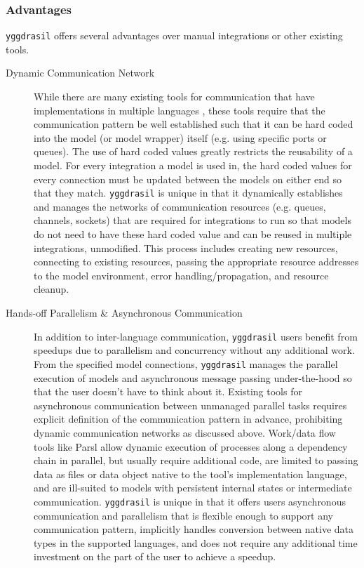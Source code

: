 \documentclass[journal]{IEEEtran}
\newcommand{\pkg}{{\tt yggdrasil}{}}
\begin{document}
\subsubsection{Advantages}\label{SS:advantages}
%
{\pkg} offers several advantages over manual integrations or other existing tools.
%
\begin{description}
	\item[Dynamic Communication Network] While there are many existing tools for communication that have implementations in multiple languages \citep[some of which {\pkg} uses, e.g.][ZMQ, RabbitMQ, OpenMPI]{ZMQ, RMQ, Gabriel2004}, these tools require that the communication pattern be well established such that it can be hard coded into the model (or model wrapper) itself (e.g. using specific ports or queues). The use of hard coded values greatly restricts the reusability of a model. For every integration a model is used in, the hard coded values for every connection must be updated between the models on either end so that they match. {\pkg} is unique in that it dynamically establishes and manages the networks of communication resources (e.g. queues, channels, sockets) that are required for integrations to run so that models do not need to have these hard coded value and can be reused in multiple integrations, unmodified. This process includes creating new resources, connecting to existing resources, passing the appropriate resource addresses to the model environment, error handling/propagation, and resource cleanup. 
	\item[Hands-off Parallelism \& Asynchronous Communication] In addition to inter-language communication, {\pkg} users benefit from speedups due to parallelism and concurrency without any additional work. From the specified model connections, {\pkg} manages the parallel execution of models and asynchronous message passing under-the-hood so that the user doesn't have to think about it. Existing tools for asynchronous communication between unmanaged parallel tasks \citep[e.g. Jack2,][]{Magoules2018} requires explicit definition of the communication pattern in advance, prohibiting dynamic communication networks as discussed above. Work/data flow tools like Parsl \citep{babuji18} allow dynamic execution of processes along a dependency chain in parallel, but usually require additional code, are limited to passing data as files or data object native to the tool's implementation language, and are ill-suited to models with persistent internal states or intermediate communication. {\pkg} is unique in that it offers users asynchronous communication and parallelism that is flexible enough to support any communication pattern, implicitly handles conversion between native data types in the supported languages, and does not require any additional time investment on the part of the user to achieve a speedup.

\end{description}
\end{document}
